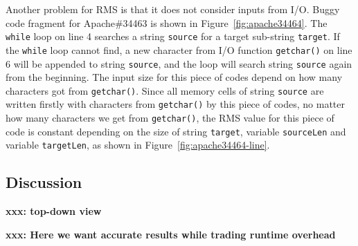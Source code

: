 Another problem for RMS is that it does not consider inputs from I/O.
Buggy code fragment for Apache\#34463 is shown 
in Figure~\ref{fig:apache34464}.
The \texttt{while} loop on line 4 searches a string \texttt{source} for a target sub-string \texttt{target}.
If the \texttt{while} loop cannot find, 
a new character from I/O function \texttt{getchar()} 
on line 6 will be appended to string \texttt{source}, 
and the loop will search string \texttt{source} again from the beginning. 
The input size for this piece of codes depend on how many characters got from \texttt{getchar()}.
Since all memory cells of string \texttt{source} are written 
firstly with characters from \texttt{getchar()} 
by this piece of codes, 
no matter how many characters we get from \texttt{getchar()}, 
the RMS value for this piece of code is constant depending 
on the size of string \texttt{target}, 
variable \texttt{sourceLen} and variable \texttt{targetLen}, 
as shown in Figure~\ref{fig:apache34464-line}.

\subsection{Discussion}

{\bf xxx: top-down view}

{\bf xxx: Here we want accurate results while trading runtime overhead}